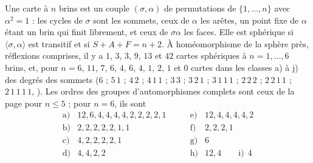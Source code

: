 \begin{encadre}
\begin{theoreme*}
Une carte à $n$ brins est un couple $(\sigma, \alpha)$ de permutations de $\{1, \ldots, n\}$ avec $\alpha^2 = 1$ : les cycles de $\sigma$ sont les sommets, ceux de $\alpha$ les arêtes, un point fixe de $\alpha$ étant un brin qui finit librement, et ceux de $\sigma\alpha$ les faces. Elle est sphérique si $\langle \sigma, \alpha \rangle$ est transitif et si $S + A + F = n + 2$. À homéomorphisme de la sphère près, réflexions comprises, il y a $1$, $3$, $3$, $9$, $13$ et $42$ cartes sphériques à $n = 1, \ldots, 6$ brins, et, pour $n = 6$, $11$, $7$, $6$, $4$, $6$, $4$, $1$, $2$, $1$ et $0$ cartes dans les classes a) à j) des degrés des sommets ($6$ ; $5\,1$ ; $4\,2$ ; $4\,1\,1$ ; $3\,3$ ; $3\,2\,1$ ; $3\,1\,1\,1$ ; $2\,2\,2$ ; $2\,2\,1\,1$ ; $2\,1\,1\,1\,1$, ). Les ordres des groupes d'automorphismes complets sont ceux de la page pour $n \leq 5$ ; pour $n = 6$, ils sont
\[
\begin{array}{ll}
\text{a)} & 12, 6, 4, 4, 4, 4, 2, 2, 2, 2, 1\\
\text{b)} & 2, 2, 2, 2, 2, 1, 1\\
\text{c)} & 4, 2, 2, 2, 2, 1\\
\text{d)} & 4, 4, 2, 2
\end{array}
\qquad
\begin{array}{ll}
\text{e)} & 12, 4, 4, 4, 4, 2\\
\text{f)} & 2, 2, 2, 1\\
\text{g)} & 6\\
\text{h)} & 12, 4 \qquad \text{i)}\ \ 4
\end{array}
\]
\end{theoreme*}
\end{encadre}
